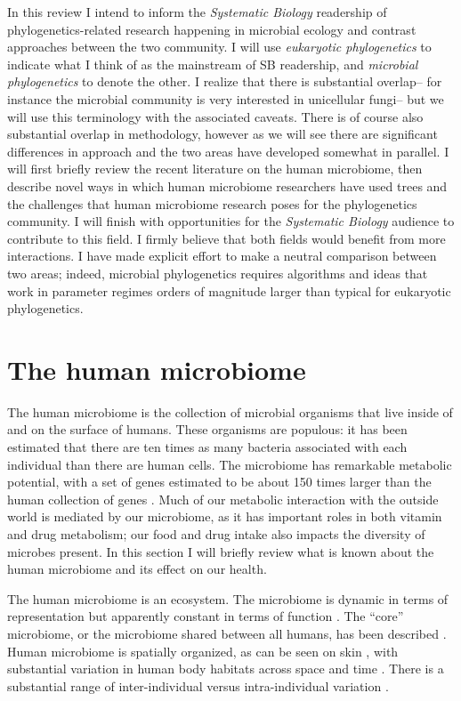 \documentclass{amsart}
\begin{document}
In this review I intend to inform the \textit{Systematic Biology} readership of phylogenetics-related research happening in microbial ecology and contrast approaches between the two community.
I will use \textit{eukaryotic phylogenetics} to indicate what I think of as the mainstream of SB readership, and \textit{microbial phylogenetics} to denote the other.
I realize that there is substantial overlap-- for instance the microbial community is very interested in unicellular fungi-- but we will use this terminology with the associated caveats.
There is of course also substantial overlap in methodology, however as we will see there are significant differences in approach and the two areas have developed somewhat in parallel.
I will first briefly review the recent literature on the human microbiome, then describe novel ways in which human microbiome researchers have used trees and the challenges that human microbiome research poses for the phylogenetics community.
I will finish with opportunities for the \textit{Systematic Biology} audience to contribute to this field.
I firmly believe that both fields would benefit from more interactions.
I have made explicit effort to make a neutral comparison between two areas; indeed, microbial phylogenetics requires algorithms and ideas that work in parameter regimes orders of magnitude larger than typical for eukaryotic phylogenetics.

\section{The human microbiome}
The human microbiome is the collection of microbial organisms that live inside of and on the surface of humans.
These organisms are populous: it has been estimated that there are ten times as many bacteria associated with each individual than there are human cells.
The microbiome has remarkable metabolic potential, with a set of genes estimated to be about 150 times larger than the human collection of genes \citep{qin2010human}.
Much of our metabolic interaction with the outside world is mediated by our microbiome, as it has important roles in both vitamin
and drug \citep{maurice2013xenobiotics} metabolism; our food and drug intake also impacts the diversity of microbes present.
In this section I will briefly review what is known about the human microbiome and its effect on our health.

The human microbiome is an ecosystem.
The microbiome is dynamic in terms of representation but apparently constant in terms of function \citep{hmp2012structure}.
The ``core'' microbiome, or the microbiome shared between all humans, has been described \citep{turnbaugh2008core}.
Human microbiome is spatially organized, as can be seen on skin \citep{grice2009topographical}, with substantial variation in human body habitats across space and time \citep{costello2009bacterial}.
There is a substantial range of inter-individual versus intra-individual variation \citep{hmp2012structure}.
\end{document}
